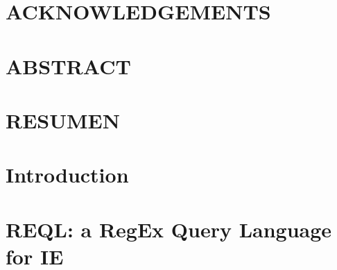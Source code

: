 \documentclass[pdftex]{pucthesis}	%
\begin{document}



 \label{acknowledgements} %
\chapter*{ACKNOWLEDGEMENTS}


\cleardoublepage



\tableofcontents
{} \label{listoffigures}
\listoffigures
{} \label{listoftables}
\listoftables
\cleardoublepage



 \label{abstract}
\chapter*{ABSTRACT}

\cleardoublepage

 \label{resumen}
\chapter*{RESUMEN}

\cleardoublepage



\chapter[INTRODUCTION]{Introduction}


\chapter[REQL: A REGEX QUERY LANGUAGE FOR IE]{REQL: a RegEx Query Language for IE} \label{chpt:regex}

\end{document}
